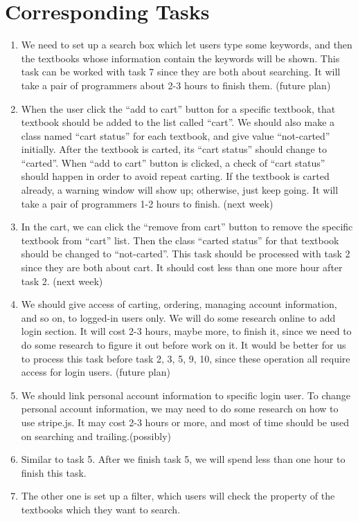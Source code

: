 \documentclass[12pt]{article}
\begin{document}
	\section{Corresponding Tasks}
		\begin{enumerate}
		\item We need to set up a search box which let users type some keywords, and then the textbooks whose information contain the keywords will be shown. 
		This task can be worked with task 7 since they are both about searching. 
		It will take a pair of programmers about 2-3 hours to finish them. (future plan)
		\item When the user click the “add to cart” button for a specific textbook, that textbook should be added to the list called “cart”. 
		We should also make a class named “cart status” for each textbook, and give value “not-carted” initially. 
		After the textbook is carted, its “cart status” should change to “carted”. 
		When “add to cart” button is clicked, a check of “cart status” should happen in order to avoid repeat carting. 
		If the textbook is carted already, a warning window will show up; otherwise, just keep going. 
		It will take a pair of programmers 1-2 hours to finish. (next week)
		\item	In the cart, we can click the “remove from cart” button to remove the specific textbook from “cart” list. 
		Then the class “carted status” for that textbook should be changed to “not-carted”. 
		This task should be processed with task 2 since they are both about cart. 
		It should cost less than one more hour after task 2. (next week)
		\item	We should give access of carting, ordering, managing account information, and so on, to logged-in users only. 
		We will do some research online to add login section. 
		It will cost 2-3 hours, maybe more, to finish it, since we need to do some research to figure it out before work on it. 
		It would be better for us to process this task before task 2, 3, 5, 9, 10, since these operation all require access for login users. (future plan)
		\item	We should link personal account information to specific login user. 
		To change personal account information, we may need to do some research on how to use stripe.js. 
		It may cost 2-3 hours or more, and most of time should be used on searching and trailing.(possibly)
		\item Similar to task 5. After we finish task 5, we will spend less than one hour to finish this task.	
		\item	The other one is set up a filter, which users will check the property of the textbooks which they want to search. 

\end{enumerate}
\end{document}
